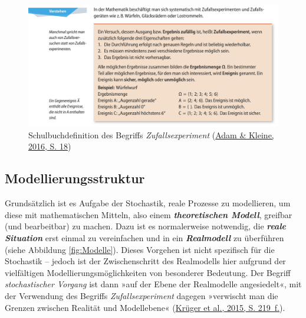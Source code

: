 \documentclass[
]{scrbook}
\theoremstyle{definition}
\theoremstyle{definition}
\theoremstyle{definition}
\theoremstyle{definition}
\theoremstyle{remark}
\begin{document}
\begin{figure}

{\centering \includegraphics[width=0.95\linewidth]{pictures/14-DefinitionZufallsexperiment} 

}

\caption{Schulbuchdefinition des Begriffs \emph{Zufallsexperiment} (\protect\hyperlink{ref-Adam2016}{Adam \& Kleine, 2016, S. 18})}\label{fig:DefinitionZufallsexperiment}
\end{figure}

\hypertarget{modellierungsstruktur}{%
\subsection{Modellierungsstruktur}\label{modellierungsstruktur}}

Grundsätzlich ist es Aufgabe der Stochastik, reale Prozesse zu modellieren, um diese mit mathematischen Mitteln, also einem \textbf{\emph{theoretischen Modell}}, greifbar (und bearbeitbar) zu machen. Dazu ist es normalerweise notwendig, die \textbf{\emph{reale Situation}} erst einmal zu vereinfachen und in ein \textbf{\emph{Realmodell}} zu überführen (siehe Abbildung \ref{fig:Modelle}). Dieses Vorgehen ist nicht spezifisch für die Stochastik -- jedoch ist der Zwischenschritt des Realmodells hier aufgrund der vielfältigen Modellierungsmöglichkeiten von besonderer Bedeutung. Der Begriff \emph{stochastischer Vorgang} ist dann »auf der Ebene der Realmodelle angesiedelt«, mit der Verwendung des Begriffs \emph{Zufallsexperiment} dagegen »verwischt man die Grenzen zwischen Realität und Modellebene« (\protect\hyperlink{ref-Kruger2015}{Krüger et al., 2015, S. 219~f.}).
\end{document}
